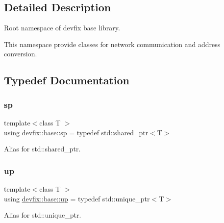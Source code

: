 \subsection{Detailed Description}
Root namespace of devfix base library. 

This namespace provide classes for network communication and address conversion. 

\subsection{Typedef Documentation}
\mbox{\label{namespacedevfix_1_1base_ad239a07977b9e77ffabaf558636d0b8b}} 
\subsubsection{\texorpdfstring{sp}{sp}}
{\footnotesize\ttfamily template$<$class T $>$ \\
using \hyperlink{namespacedevfix_1_1base_ad239a07977b9e77ffabaf558636d0b8b}{devfix\+::base\+::sp} = typedef std\+::shared\+\_\+ptr$<$T$>$}



Alias for std\+::shared\+\_\+ptr. 

\mbox{\label{namespacedevfix_1_1base_a18dfbd492717795cee1cfa6f14a8f724}} 
\subsubsection{\texorpdfstring{up}{up}}
{\footnotesize\ttfamily template$<$class T $>$ \\
using \hyperlink{namespacedevfix_1_1base_a18dfbd492717795cee1cfa6f14a8f724}{devfix\+::base\+::up} = typedef std\+::unique\+\_\+ptr$<$T$>$}



Alias for std\+::unique\+\_\+ptr. 

